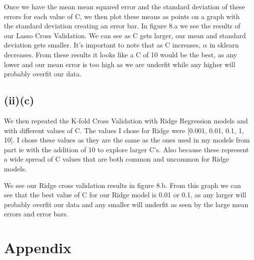 \documentclass{article}
\begin{document}
Once we have the mean mean squared error and the standard deviation of these errors for each value of C, we then plot these means as points on a graph with the standard deviation creating an error bar.
In figure 8.a we see the results of our Lasso Cross Validation. We can see as C gets larger, our mean and standard deviation gets smaller. It's important to note that as C increases, $\alpha$ in sklearn decreases. From these results it looks like a C of 10 would be the best, as any lower and our mean error is too high as we are underfit while any higher will probably overfit our data. 

\subsection{(ii)(c)}
We then repeated the K-fold Cross Validation with Ridge Regression models and with different values of C. The values I chose for Ridge were [0.001, 0.01, 0.1, 1, 10]. I chose these values as they are the same as the ones used in my models from part ie with the addition of 10 to explore larger C's. Also because these represent a wide spread of C values that are both common and uncommon for Ridge models.

We see our Ridge cross validation results in figure 8.b. From this graph we can see that the best value of C for our Ridge model is 0.01 or 0.1, as any larger will probably overfit our data and any smaller will underfit as seen by the large mean errors and error bars. 



\section{Appendix}

\end{document}

